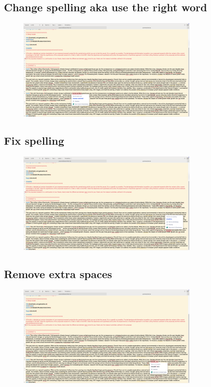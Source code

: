 \documentclass[12pt]{article}
\begin{document}
\subsection{Change spelling aka use the right word}
\begin{figure}[h!] 
    \centering
    \includegraphics[width=0.8\textwidth]{rightword.png} 
\end{figure}


\subsection{Fix spelling}
\begin{figure}[h!] 
    \centering
    \includegraphics[width=0.8\textwidth]{spelling.png} 
\end{figure}

\newpage

\subsection{Remove extra spaces}
\begin{figure}[h!] 
    \centering
    \includegraphics[width=0.8\textwidth]{space.png} 
\end{figure}
\end{document}
